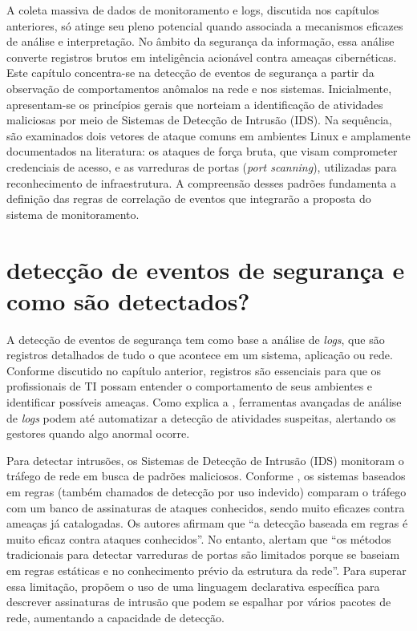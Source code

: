 \documentclass[
    12pt
    ,oneside
    ,a4paper
    ,chapter=TITLE
    ,section=TITLE
    ,sumario=abnt-6027-2012]{abntex2}
\begin{document}
A coleta massiva de dados de monitoramento e logs, discutida nos capítulos anteriores, só atinge seu pleno potencial quando associada a mecanismos eficazes de análise e interpretação. No âmbito da segurança da informação, essa análise converte registros brutos em inteligência acionável contra ameaças cibernéticas. Este capítulo concentra-se na detecção de eventos de segurança a partir da observação de comportamentos anômalos na rede e nos sistemas. Inicialmente, apresentam-se os princípios gerais que norteiam a identificação de atividades  maliciosas por meio de Sistemas de Detecção de Intrusão (IDS). Na sequência, são examinados dois vetores de ataque comuns em ambientes Linux e amplamente documentados na literatura: os ataques de força bruta, que visam comprometer credenciais de acesso, e as varreduras de portas (\textit{port scanning}), utilizadas para reconhecimento de infraestrutura. A compreensão desses padrões fundamenta a definição das regras de correlação de eventos que integrarão a proposta do sistema de monitoramento.

\section{detecção de eventos de segurança e como são detectados?}

A detecção de eventos de segurança tem como base a análise de \textit{logs}, que são registros detalhados de tudo o que acontece em um sistema, aplicação ou rede. Conforme discutido no capítulo anterior, registros são essenciais para que os profissionais de TI possam entender o comportamento de seus ambientes e identificar possíveis ameaças. Como explica a , ferramentas avançadas de análise de \textit{logs} podem até automatizar a detecção de atividades suspeitas, alertando os gestores quando algo anormal ocorre.

Para detectar intrusões, os Sistemas de Detecção de Intrusão (IDS) monitoram o tráfego de rede em busca de padrões maliciosos. Conforme , os sistemas baseados em regras (também chamados de detecção por uso indevido) comparam o tráfego com um banco de assinaturas de ataques conhecidos, sendo muito eficazes contra ameaças já catalogadas. Os autores afirmam que “a detecção baseada em regras é muito eficaz contra ataques conhecidos”. No entanto,  alertam que “os métodos tradicionais para detectar varreduras de portas são limitados porque se baseiam em regras estáticas e no conhecimento prévio da estrutura da rede”. Para superar essa limitação,  propõem o uso de uma linguagem declarativa específica para descrever assinaturas de intrusão que podem se espalhar por vários pacotes de rede, aumentando a capacidade de detecção.
\end{document}
